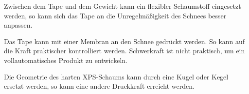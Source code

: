 
Zwischen dem Tape und dem Gewicht kann ein flexibler Schaumstoff eingesetzt werden, so kann sich das Tape an die Unregelmäßigkeit des Schnees besser anpassen.

Das Tape kann mit einer Membran an den Schnee gedrückt werden. So kann auf die Kraft praktischer kontrolliert werden. Schwerkraft ist nicht praktisch, um ein vollautomatisches Produkt zu entwickeln.

Die Geometrie des harten XPS-Schaums kann durch eine Kugel oder Kegel ersetzt werden, so kann eine andere Druckkraft erreicht werden.
